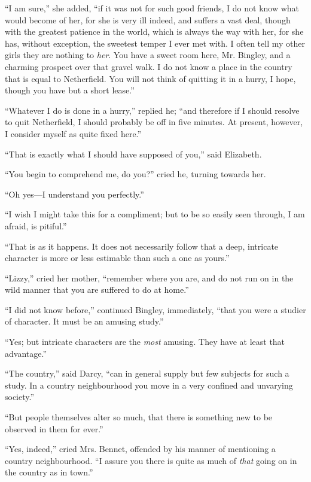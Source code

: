 \documentclass[12pt]{book}
\begin{document}
``I am sure,'' she added, ``if it was not for such good friends, I do not know what would become of her, for she is very ill indeed, and suffers a vast deal, though with the greatest patience in the world, which is always the way with her, for she has, without exception, the sweetest temper I ever met with. I often tell my other girls they are nothing to \textit{her}. You have a sweet room here, Mr. Bingley, and a charming prospect over that gravel walk. I do not know a place in the country that is equal to Netherfield. You will not think of quitting it in a hurry, I hope, though you have but a short lease.''

``Whatever I do is done in a hurry,'' replied he; ``and therefore if I should resolve to quit Netherfield, I should probably be off in five minutes. At present, however, I consider myself as quite fixed here.''

``That is exactly what I should have supposed of you,'' said Elizabeth.

``You begin to comprehend me, do you?'' cried he, turning towards her.

``Oh yes---I understand you perfectly.''

``I wish I might take this for a compliment; but to be so easily seen through, I am afraid, is pitiful.''

``That is as it happens. It does not necessarily follow that a deep, intricate character is more or less estimable than such a one as yours.''

``Lizzy,'' cried her mother, ``remember where you are, and do not run on in the wild manner that you are suffered to do at home.''

``I did not know before,'' continued Bingley, immediately, ``that you were a studier of character. It must be an amusing study.''

``Yes; but intricate characters are the \textit{most} amusing. They have at least that advantage.''

``The country,'' said Darcy, ``can in general supply but few subjects for such a study. In a country neighbourhood you move in a very confined and unvarying society.''

``But people themselves alter so much, that there is something new to be observed in them for ever.''

``Yes, indeed,'' cried Mrs. Bennet, offended by his manner of mentioning a country neighbourhood. ``I assure you there is quite as much of \textit{that} going on in the country as in town.''
\end{document}
